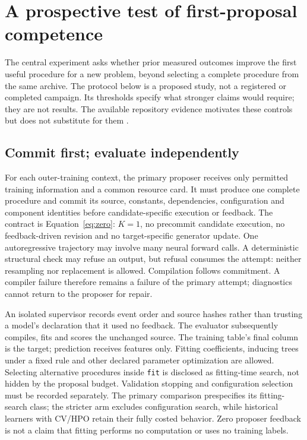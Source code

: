 \section{A prospective test of first-proposal competence}
\label{sec:protocol}

The central experiment asks whether prior measured outcomes improve the first
useful procedure for a new problem, beyond selecting a complete procedure from
the same archive. The protocol below is a proposed study, not a registered or
completed campaign. Its thresholds specify what stronger claims would require;
they are not results. The available repository evidence motivates these controls
but does not substitute for them \citep{jope,clover}.

\subsection{Commit first; evaluate independently}

For each outer-training context, the primary proposer receives only permitted
training information and a common resource card. It must produce one complete
procedure and commit its source, constants, dependencies, configuration and
component identities before candidate-specific execution or feedback. The
contract is Equation~\ref{eq:zero}: $K=1$, no precommit candidate execution,
no feedback-driven revision and no target-specific generator update. One
autoregressive trajectory may involve many neural forward calls. A deterministic
structural check may refuse an output, but refusal consumes the attempt: neither
resampling nor replacement is allowed. Compilation follows commitment. A compiler
failure therefore remains a failure of the primary attempt; diagnostics cannot
return to the proposer for repair.

An isolated supervisor records event order and source hashes rather than trusting
a model's declaration that it used no feedback. The evaluator subsequently
compiles, fits and scores the unchanged source. The training table's final column
is the target; prediction receives features only. Fitting coefficients, inducing
trees under a fixed rule and other declared parameter optimization are allowed.
Selecting alternative procedures inside \texttt{fit} is disclosed as
fitting-time search, not hidden by the proposal budget. Validation stopping and
configuration selection must be recorded separately. The primary comparison
prespecifies its fitting-search class; the stricter arm excludes configuration
search, while historical learners with CV/HPO retain their fully costed behavior.
Zero proposer feedback is not a claim that fitting performs no computation or
uses no training labels.

